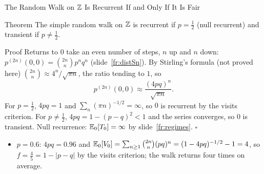 \begin{frame}{The Random Walk on $\mathbb{Z}$ Is Recurrent If and Only If It Is Fair}
  \label{fr:walkZ}
  \small
  \begin{block}{Theorem}
    The simple random walk on $\mathbb{Z}$ is recurrent if $p=\tfrac12$ (null recurrent) and transient if $p\ne\tfrac12$.
  \end{block}
  \begin{block}{Proof}
    Returns to $0$ take an even number of steps, $n$ up and $n$ down: $p^{(2n)}(0,0)=\binom{2n}{n}p^nq^n$ (slide~\ref{fr:distSn}). By Stirling's formula (not proved here) $\binom{2n}n\approx4^n/\sqrt{\pi n}$, the ratio tending to $1$, so
    \[
      p^{(2n)}(0,0)\approx\frac{(4pq)^n}{\sqrt{\pi n}} .
    \]
    For $p=\tfrac12$, $4pq=1$ and $\sum_n(\pi n)^{-1/2}=\infty$, so $0$ is recurrent by the visits criterion. For $p\ne\tfrac12$, $4pq=1-(p-q)^2<1$ and the series converges, so $0$ is transient. Null recurrence: $\mathbb{E}_0[T_0]=\infty$ by slide~\ref{fr:regimes}. \hfill$\square$
  \end{block}
  \begin{itemize}
    \item $p=0.6$: $4pq=0.96$ and $\mathbb{E}_0[V_0]=\sum_{n\ge1}\binom{2n}{n}(pq)^n=(1-4pq)^{-1/2}-1=4$, so $f=\tfrac45=1-|p-q|$ by the visits criterion; the walk returns four times on average.
  \end{itemize}
\end{frame}


